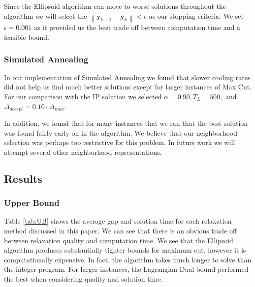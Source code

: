 \documentclass[12pt]{article}
\theoremstyle{plain}
\theoremstyle{definition}
\newcommand{\norm}[1]{\left\lVert#1\right\rVert}
\begin{document}
Since the Ellipsoid algorithm can move to worse solutions throughout the algorithm we will select the $\norm{\mathbf{y}_{k+1} - \mathbf{y}_k} < \epsilon$ as our stopping criteria. We set $\epsilon = 0.001$ as it provided us the best trade off between computation time and a feasible bound.

\subsubsection{Simulated Annealing}

In our implementation of Simulated Annealing we found that slower cooling rates did not help us find much better solutions except for larger instances of Max Cut. For our comparison with the IP solution we selected $\alpha = 0.90, T_L = 500,$ and $\Delta_{accept} = 0.10 \cdot \Delta_{max}$.

In addition, we found that for many instances that we ran that the best solution was found fairly early on in the algorithm. We believe that our neighborhood selection was perhaps too restrictive for this problem. In future work we will attempt several other neighborhood representations.

\subsection{Results}


\subsubsection{Upper Bound}

Table \ref{tab:UB} shows the average gap and solution time for each relaxation method discussed in this paper. We can see that there is an obvious trade off between relaxation quality and computation time. We see that the Ellipsoid algorithm produces substantially tighter
bounds for maximum cut, however it is computationally expensive. In fact, the algorithm takes much longer to solve than the integer program. For larger instances, the Lagrangian Dual bound performed the best when considering quality and solution time. 
\end{document}

